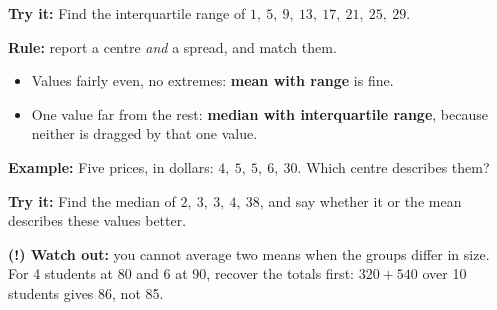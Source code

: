 \documentclass[12pt]{article}
\begin{document}
\begin{tryitbox}
\textbf{Try it:} \quad Find the interquartile range of
$1,\ 5,\ 9,\ 13,\ 17,\ 21,\ 25,\ 29$.\\[2pt]
\end{tryitbox}


\begin{formulabox}
\textbf{Rule:} report a centre \emph{and} a spread, and match them.\par
\begin{itemize}[leftmargin=1.1cm, itemsep=1pt, topsep=2pt]
  \item Values fairly even, no extremes: \textbf{mean with range} is fine.
  \item One value far from the rest: \textbf{median with interquartile range},
        because neither is dragged by that one value.
\end{itemize}
\end{formulabox}

\begin{examplebox}
\textbf{Example:} \quad Five prices, in dollars: $4,\ 5,\ 5,\ 6,\ 30$. Which
centre describes them?
\end{examplebox}

\begin{tryitbox}
\textbf{Try it:} \quad Find the median of $2,\ 3,\ 3,\ 4,\ 38$, and say whether
it or the mean describes these values better.\\[2pt]
\end{tryitbox}

\begin{watchoutbox}
\textbf{(!) Watch out:} you cannot average two means when the groups differ in
size. For 4 students at 80 and 6 at 90, recover the totals first: $320 + 540$
over 10 students gives 86, not 85.
\end{watchoutbox}
\end{document}
